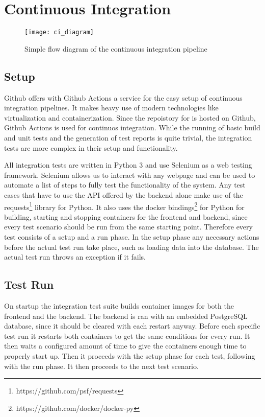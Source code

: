 \section{Continuous Integration}

\begin{figure}[h]
	\texttt{[image: ci\_diagram]}
  \caption{Simple flow diagram of the continuous integration pipeline}
	\centering

\end{figure}

\subsection{Setup}
Github offers with Github Actions a service for the easy setup of continuous integration pipelines. It makes heavy use of modern technologies like virtualization and containerization. Since the repoistory for \parkview{} is hosted on Github, Github Actions is used for continuos integration. While the running of basic build and unit tests and the generation of test reports is quite trivial, the integration tests are more complex in their setup and functionality.

All integration tests are written in Python 3 and use Selenium as a web testing framework. Selenium allows us to interact with any webpage and can be used to automate a list of steps to fully test the functionality of the system. Any test cases that have to use the API offered by the backend alone make use of the requests\footnote{https://github.com/psf/requests} library for Python. It also uses the docker bindings\footnote{https://github.com/docker/docker-py} for Python for building, starting and stopping containers for the frontend and backend, since every test scenario should be run from the same starting point. Therefore every test consists of a setup and a run phase. In the setup phase any necessary actions before the actual test run take place, such as loading data into the database. The actual test run throws an exception if it fails.

\subsection{Test Run}
On startup the integration test suite builds container images for both the frontend and the backend. The backend is ran with an embedded PostgreSQL database, since it should be cleared with each restart anyway. Before each specific test run it restarts both containers to get the same conditions for every run. It then waits a configured amount of time to give the containers enough time to properly start up. Then it proceeds with the setup phase for each test, following with the run phase. It then proceeds to the next test scenario.


